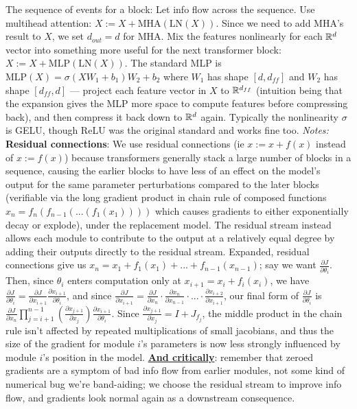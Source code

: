 \documentclass[12pt]{article}
\begin{document}
\begin{outline}
The sequence of events for a block:
\1 Let info flow across the sequence. Use multihead attention: $\boxed{X := X + \text{MHA}(\text{LN}(X))}$. Since we need to add MHA's result to $X$, we set $d_{out}=d$ for MHA.
\1 Mix the features nonlinearly for each $\mathbb{R}^d$ vector into something more useful for the next transformer block: $\boxed{X := X + \text{MLP}(\text{LN}(X))}$. The standard MLP is $\text{MLP}(X) = \sigma(XW_1 + b_1) W_2 + b_2$ where $W_1$ has shape $[d,d_{ff}]$ and $W_2$ has shape $[d_{ff},d]$ --- project each feature vector in $X$ to $\mathbb{R}^{d_{ff}}$ (intuition being that the expansion gives the MLP more space to compute features before compressing back), and then compress it back down to $\mathbb{R}^d$ again. Typically the nonlinearity $\sigma$ is GELU, though ReLU was the original standard and works fine too.
\1 \textit{Notes:}
\2 \textbf{Residual connections}: We use residual connections (ie $x := x + f(x)$ instead of $x := f(x)$) because transformers generally stack a large number of blocks in a sequence, causing the earlier blocks to have less of an effect on the model's output for the same parameter perturbations compared to the later blocks (verifiable via the long gradient product in chain rule of composed functions $x_n = f_n(f_{n-1}(...(f_1(x_1))))$ which causes gradients to either exponentially decay or explode), under the replacement model. The residual stream instead allows each module to contribute to the output at a relatively equal degree by adding their outputs directly to the residual stream. Expanded, residual connections give us $x_n = x_1 + f_1(x_1) + ... + f_{n-1}(x_{n-1})$; say we want $\displaystyle \frac{\partial J}{\partial \theta_i}$. Then, since $\theta_i$ enters computation only at $x_{i+1} = x_i + f_i(x_i)$, we have $\displaystyle \frac{\partial J}{\partial \theta_i} = \frac{\partial J}{\partial x_{i+1}} \frac{\partial x_{i+1}}{\partial \theta_i}$, and since $\displaystyle \frac{\partial J}{\partial x_{i+1}} = \frac{\partial J}{\partial x_n} \cdot \frac{\partial x_n}{\partial x_{n-1}} \cdot ... \cdot \frac{\partial x_{i+2}}{\partial x_{i+1}}$, our final form of $\displaystyle \frac{\partial J}{\partial \theta_i}$ is $\displaystyle \frac{\partial J}{\partial x_n} \prod_{j=i+1}^{n-1} \left(\frac{\partial x_{j+1}}{\partial x_j}\right) \frac{\partial x_{i+1}}{\partial \theta_i}$. Since $\displaystyle \frac{\partial x_{j+1}}{\partial x_j} = I + J_{f_j}$, the middle product in the chain rule isn't affected by repeated multiplications of small jacobians, and thus the size of the gradient for module $i$'s parameters is now less strongly influenced by module $i$'s position in the model. \textbf{\underline{And critically}}: remember that zeroed gradients are a symptom of bad info flow from earlier modules, not some kind of numerical bug we're band-aiding; we choose the residual stream to improve info flow, and gradients look normal again as a downstream consequence.

\end{outline}
\end{document}
